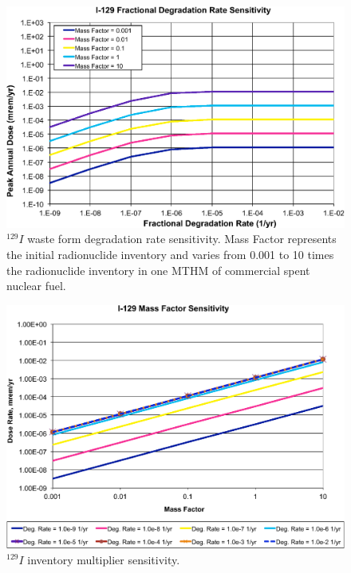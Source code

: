 \begin{figure}[ht!]
  \centering
  \includegraphics[width=\linewidth]{I129_deg_rate.eps}
  \caption{$^{129}I$ waste form degradation rate sensitivity. Mass Factor 
represents the initial radionuclide inventory and varies from 0.001 to 10 times 
the radionuclide inventory in one \gls{MTHM} of commercial spent nuclear fuel.}
  \label{fig:WFDegI129}
\end{figure}

\begin{figure}[ht!]
  \centering
  \includegraphics[width=\linewidth]{I129_mass_factor.eps}
  \caption{$^{129}I$ inventory multiplier sensitivity.}
  \label{fig:WFDegI129MF}
\end{figure}




